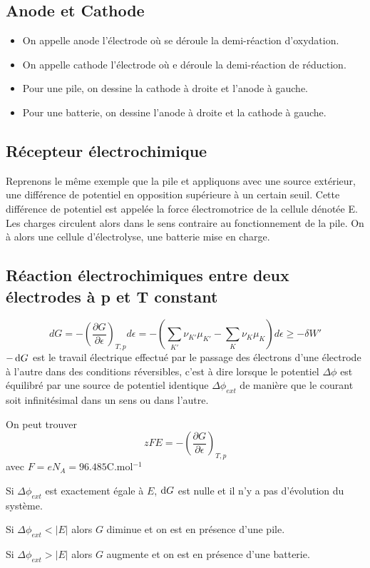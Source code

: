 \subsection{Anode et Cathode}
\begin{itemize}
  \item On appelle anode l'électrode où se déroule la demi-réaction d'oxydation.
  \item On appelle cathode l'électrode où
    e déroule la demi-réaction de réduction.
  \item Pour une pile, on dessine la cathode à droite et l'anode à gauche.
  \item Pour une batterie, on dessine l'anode à droite et la cathode à gauche.
\end{itemize}
\subsection{Récepteur électrochimique}
Reprenons le même exemple que la pile et appliquons avec une source extérieur,
une différence de potentiel en opposition supérieure à un certain seuil.
Cette différence de potentiel est appelée
la force électromotrice de la cellule dénotée E.
Les charges circulent alors dans le sens contraire au fonctionnement de la pile.
On à alors une cellule d'électrolyse, une batterie mise en charge.
\subsection{Réaction électrochimiques entre deux électrodes à p et T constant}
\[ dG = -\left(\frac{\partial G}{\partial \epsilon }\right)_{T,p}d\epsilon =
  -\left(\sum_{K'}\nu_{K'}\mu_{K'}-
\sum_{K}\nu_{K}\mu_{K}\right)d\epsilon \geqslant - \delta W' \]
$-\operatorname{d}\! G$ est le travail électrique effectué par le passage des électrons
d'une électrode à l'autre dans des conditions réversibles,
c'est à dire lorsque le potentiel $\Delta \phi$ est équilibré par une source
de potentiel identique $\Delta \phi_{ext}$ de manière que le courant soit
infinitésimal dans un sens ou dans l'autre.

On peut trouver
\[ zFE = -\left(\frac{\partial G}{\partial \epsilon }\right)_{T,p} \]
avec $F = eN_A = 96.485$C.mol$^{-1}$

Si $\Delta \phi_{ext}$ est exactement égale à $E$, $\operatorname{d}\! G$ est nulle et
il n'y a pas d'évolution du système.

Si $\Delta \phi_{ext} < |E|$ alors $G$ diminue et on est en présence d'une pile.

Si $\Delta \phi_{ext} > |E|$ alors $G$ augmente et
on est en présence d'une batterie.

